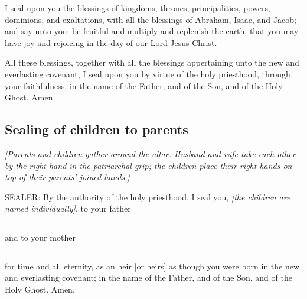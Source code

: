 		I seal upon you the blessings of kingdoms, thrones, principalities, powers, dominions, and exaltations, with all the blessings of Abraham, Isaac, and Jacob; and say unto you: be fruitful and multiply and replenish the earth, that you may have joy and rejoicing in the day of our Lord Jesus Christ.

		All these blessings, together with all the blessings appertaining unto the new and everlasting covenant, I seal upon you by virtue of the holy priesthood, through your faithfulness, in the name of the Father, and of the Son, and of the Holy Ghost. Amen.
	
	\subsection{Sealing of children to parents}
		
		\textit{[Parents and children gather around the altar. Husband and wife take each other by the right hand in the patriarchal grip; the children place their right hands on top of their parents' joined hands.]}

		SEALER: By the authority of the holy priesthood, I seal you, \textit{[the children are named individually]}, to your father \rule{1cm}{0.15mm} and to your mother \rule{1cm}{0.15mm} for time and all eternity, as an heir [or heirs] as though you were born in the new and everlasting covenant; in the name of the Father, and of the Son, and of the Holy Ghost. Amen.